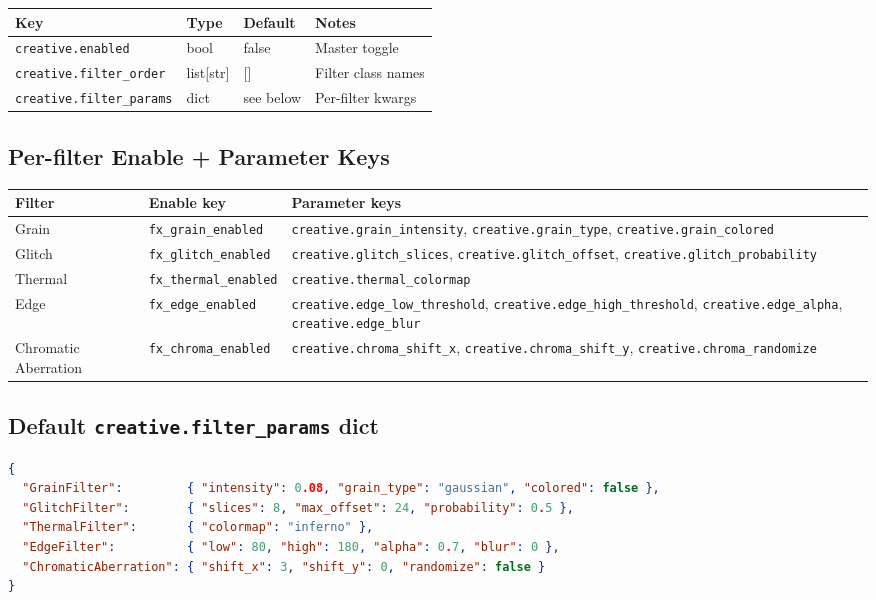 \documentclass[11pt,a4paper,openany]{report}
\begin{document}
\begin{tabularx}{\linewidth}{@{}lllX@{}}
    \toprule
    \textbf{Key} & \textbf{Type} & \textbf{Default} & \textbf{Notes} \\
    \midrule
    \texttt{creative.enabled}        & bool      & false & Master toggle \\
    \texttt{creative.filter\_order}  & list[str] & []    & Filter class names \\
    \texttt{creative.filter\_params} & dict      & see below & Per-filter kwargs \\
    \bottomrule
\end{tabularx}

\subsection{Per-filter Enable + Parameter Keys}

\begin{tabularx}{\linewidth}{@{}llX@{}}
    \toprule
    \textbf{Filter} & \textbf{Enable key} & \textbf{Parameter keys} \\
    \midrule
    Grain                & \texttt{fx\_grain\_enabled}   & \texttt{creative.grain\_intensity}, \texttt{creative.grain\_type}, \texttt{creative.grain\_colored} \\
    Glitch               & \texttt{fx\_glitch\_enabled}  & \texttt{creative.glitch\_slices}, \texttt{creative.glitch\_offset}, \texttt{creative.glitch\_probability} \\
    Thermal              & \texttt{fx\_thermal\_enabled} & \texttt{creative.thermal\_colormap} \\
    Edge                 & \texttt{fx\_edge\_enabled}    & \texttt{creative.edge\_low\_threshold}, \texttt{creative.edge\_high\_threshold}, \texttt{creative.edge\_alpha}, \texttt{creative.edge\_blur} \\
    Chromatic Aberration & \texttt{fx\_chroma\_enabled}  & \texttt{creative.chroma\_shift\_x}, \texttt{creative.chroma\_shift\_y}, \texttt{creative.chroma\_randomize} \\
    \bottomrule
\end{tabularx}

\subsection{Default \texttt{creative.filter\_params} dict}

\begin{lstlisting}[language=json]
{
  "GrainFilter":         { "intensity": 0.08, "grain_type": "gaussian", "colored": false },
  "GlitchFilter":        { "slices": 8, "max_offset": 24, "probability": 0.5 },
  "ThermalFilter":       { "colormap": "inferno" },
  "EdgeFilter":          { "low": 80, "high": 180, "alpha": 0.7, "blur": 0 },
  "ChromaticAberration": { "shift_x": 3, "shift_y": 0, "randomize": false }
}
\end{lstlisting}
\end{document}
